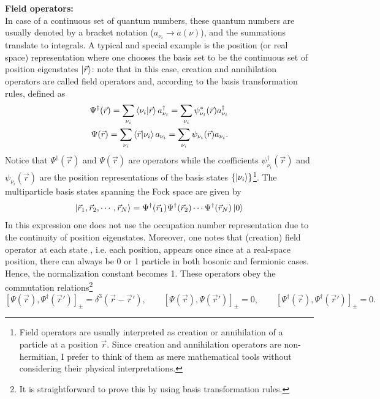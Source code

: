 \documentclass[a4paper,12pts]{article}
\numberwithin{equation}{section}
\begin{document}
	\textbf{Field operators:}\\
	In case of a continuous set of quantum numbers, these quantum numbers are usually denoted by a bracket notation ($a_{\nu_i}\rightarrow a(\nu)$), and the summations translate to integrals. A typical and special example is the position (or real space) representation where one chooses the basis set to be the continuous set of position eigenstates $\ket{\vec{r}}$: note that in this case, creation and annihilation operators are called field operators and, according to the basis transformation rules, defined as
	\begin{align}
	\Psi^{\dagger}(\vec{r}) = \sum_{\nu_i}\braket{\nu_i|\vec{r}}a^{\dagger}_{\nu_i} = \sum_{\nu_i}\psi_{\nu_i}^*(\vec{r}) a^{\dagger}_{\nu_i}\\
	\Psi(\vec{r}) = \sum_{\nu_i}\braket{\vec{r}|\nu_i}a_{\nu_i} = \sum_{\nu_i}\psi_{\nu_i}(\vec{r}) a_{\nu_i}.
	\end{align}
	Notice that $\Psi^{\dagger}(\vec{r})$ and $\Psi(\vec{r})$ are operators while the coefficients $\psi^{\dagger}_{\nu_i}(\vec{r})$ and $\psi_{\nu_i}(\vec{r})$ are the position representations of the basis states $\{\ket{\nu_i}\}$\footnote{Field operators are usually interpreted as creation or annihilation of a particle at a position $\vec{r}$. Since creation and annihilation operators are non-hermitian, I prefer to think of them as mere mathematical tools without considering their physical interpretations.}. The multiparticle basis states spanning the Fock space are given by
	\begin{equation}
	\ket{\vec{r}_1,\vec{r}_2,\cdots,\vec{r}_N} = \Psi^{\dagger}(\vec{r}_1)\Psi^{\dagger}(\vec{r}_2)\cdots\Psi^{\dagger}(\vec{r}_N)\ket{0}
	\end{equation}
	In this expression one does not use the occupation number representation due to the continuity of position eigenstates. Moreover, one notes that (creation) field operator at each state , i.e. each position, appears once since at a real-space position, there can always be 0 or 1 particle in both bosonic and fermionic cases. Hence, the normalization constant becomes 1. These operators obey the commutation relations\footnote{It is straightforward to prove this by using basis transformation rules.}
	\begin{equation}
	\left[\Psi(\vec{r}),\Psi^{\dagger}(\vec{r}')\right]_{\pm} = \delta^3(\vec{r}-\vec{r}'), \qquad \left[\Psi(\vec{r}),\Psi(\vec{r}')\right]_{\pm} = 0,\qquad \left[\Psi^{\dagger}(\vec{r}),\Psi^{\dagger}(\vec{r}')\right]_{\pm} = 0.
	\end{equation}
\end{document}
